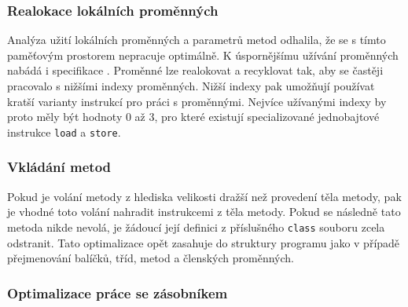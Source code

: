 
\subsubsection{Realokace lokálních proměnných}
Analýza užití lokálních proměnných a parametrů metod odhalila, že se s tímto paměťovým prostorem nepracuje optimálně. K úspornějšímu užívání proměnných nabádá i specifikace \cite{Lindholm:JVM}. Proměnné lze realokovat a recyklovat tak, aby se častěji pracovalo s nižšími indexy proměnných. Nižší indexy pak umožňují používat kratší varianty instrukcí pro práci s proměnnými. Nejvíce užívanými indexy by proto měly být hodnoty 0 až 3, pro které existují specializované jednobajtové instrukce \texttt{load} a \texttt{store}. 

\subsubsection{Vkládání metod}
Pokud je volání metody z hlediska velikosti dražší než provedení těla metody, pak je vhodné toto volání nahradit instrukcemi z těla metody. Pokud se následně tato metoda nikde nevolá, je žádoucí její definici z příslušného \texttt{class} souboru zcela odstranit. Tato optimalizace opět zasahuje do struktury programu jako v případě přejmenování balíčků, tříd, metod a členských proměnných.

\subsubsection{Optimalizace práce se zásobníkem}

